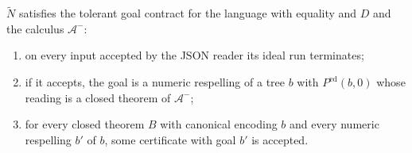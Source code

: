 \begin{theorem}\label{cert:thm:tolerant}
$\widetilde N$ satisfies the tolerant goal contract for the language with
equality and $D$ and the calculus $\mathcal A^{-}$:
\begin{enumerate}[label=(\alph*)]
\item on every input accepted by the JSON reader its ideal run terminates;
\item if it accepts, the goal is a numeric respelling of a tree $b$ with
$P^{\mathrm{ed}}(b,0)$ whose reading is a closed theorem of $\mathcal A^{-}$;
\item for every closed theorem $B$ with canonical encoding $b$ and every numeric
respelling $b'$ of $b$, some certificate with goal $b'$ is accepted.
\end{enumerate}
\end{theorem}
